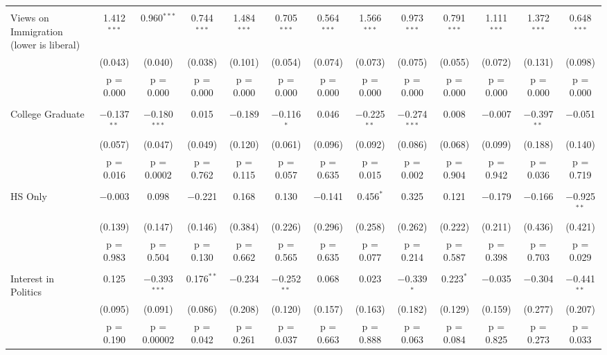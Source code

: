 \documentclass{article}
\begin{document}
\begin{landscape}
\begin{longtable}{@{\extracolsep{5pt}}lcccccccccccc}
  & & & & & & & & & & & & \\ 
 Views on Immigration (lower is liberal) & 1.412$^{***}$ & 0.960$^{***}$ & 0.744$^{***}$ & 1.484$^{***}$ & 0.705$^{***}$ & 0.564$^{***}$ & 1.566$^{***}$ & 0.973$^{***}$ & 0.791$^{***}$ & 1.111$^{***}$ & 1.372$^{***}$ & 0.648$^{***}$ \\ 
  & (0.043) & (0.040) & (0.038) & (0.101) & (0.054) & (0.074) & (0.073) & (0.075) & (0.055) & (0.072) & (0.131) & (0.098) \\ 
  & p = 0.000 & p = 0.000 & p = 0.000 & p = 0.000 & p = 0.000 & p = 0.000 & p = 0.000 & p = 0.000 & p = 0.000 & p = 0.000 & p = 0.000 & p = 0.000 \\ 
  & & & & & & & & & & & & \\ 
 College Graduate & $-$0.137$^{**}$ & $-$0.180$^{***}$ & 0.015 & $-$0.189 & $-$0.116$^{*}$ & 0.046 & $-$0.225$^{**}$ & $-$0.274$^{***}$ & 0.008 & $-$0.007 & $-$0.397$^{**}$ & $-$0.051 \\ 
  & (0.057) & (0.047) & (0.049) & (0.120) & (0.061) & (0.096) & (0.092) & (0.086) & (0.068) & (0.099) & (0.188) & (0.140) \\ 
  & p = 0.016 & p = 0.0002 & p = 0.762 & p = 0.115 & p = 0.057 & p = 0.635 & p = 0.015 & p = 0.002 & p = 0.904 & p = 0.942 & p = 0.036 & p = 0.719 \\ 
  & & & & & & & & & & & & \\ 
 HS Only & $-$0.003 & 0.098 & $-$0.221 & 0.168 & 0.130 & $-$0.141 & 0.456$^{*}$ & 0.325 & 0.121 & $-$0.179 & $-$0.166 & $-$0.925$^{**}$ \\ 
  & (0.139) & (0.147) & (0.146) & (0.384) & (0.226) & (0.296) & (0.258) & (0.262) & (0.222) & (0.211) & (0.436) & (0.421) \\ 
  & p = 0.983 & p = 0.504 & p = 0.130 & p = 0.662 & p = 0.565 & p = 0.635 & p = 0.077 & p = 0.214 & p = 0.587 & p = 0.398 & p = 0.703 & p = 0.029 \\ 
  & & & & & & & & & & & & \\ 
 Interest in Politics & 0.125 & $-$0.393$^{***}$ & 0.176$^{**}$ & $-$0.234 & $-$0.252$^{**}$ & 0.068 & 0.023 & $-$0.339$^{*}$ & 0.223$^{*}$ & $-$0.035 & $-$0.304 & $-$0.441$^{**}$ \\ 
  & (0.095) & (0.091) & (0.086) & (0.208) & (0.120) & (0.157) & (0.163) & (0.182) & (0.129) & (0.159) & (0.277) & (0.207) \\ 
  & p = 0.190 & p = 0.00002 & p = 0.042 & p = 0.261 & p = 0.037 & p = 0.663 & p = 0.888 & p = 0.063 & p = 0.084 & p = 0.825 & p = 0.273 & p = 0.033 \\ 

\end{longtable}
\end{landscape}
\end{document}
